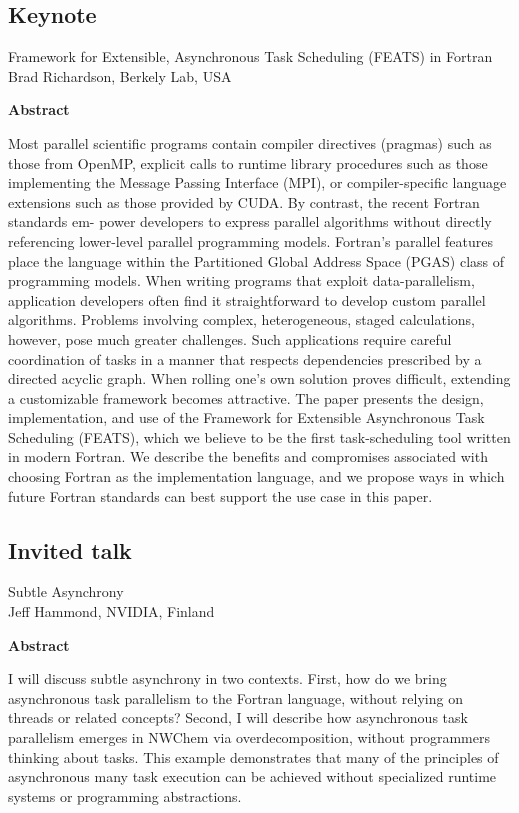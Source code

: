 \documentclass{article}
\begin{document}
\subsection{Keynote}
Framework for Extensible, Asynchronous Task Scheduling (FEATS) in Fortran\\
Brad Richardson, Berkely Lab, USA
    \begin{center}
        \textbf{Abstract}
    \end{center}
Most parallel scientific programs contain compiler directives (pragmas) such as those from OpenMP, explicit calls to runtime library procedures such as those implementing the Message Passing Interface (MPI), or compiler-specific language extensions such as those provided by CUDA. By contrast, the recent Fortran standards em- power developers to express parallel algorithms without directly referencing lower-level parallel programming models. Fortran’s parallel features place the language within the Partitioned Global Address Space (PGAS) class of programming models. When writing programs that exploit data-parallelism, application developers often find it straightforward to develop custom parallel algorithms. Problems involving complex, heterogeneous, staged calculations, however, pose much greater challenges. Such applications require careful coordination of tasks in a manner that respects dependencies prescribed by a directed acyclic graph. When rolling one’s own solution proves difficult, extending a customizable framework becomes attractive. The paper presents the design, implementation, and use of the Framework for Extensible Asynchronous Task Scheduling (FEATS), which we believe to be the first task-scheduling tool written in modern Fortran. We describe the benefits and compromises associated with choosing Fortran as the implementation language, and we propose ways in which future Fortran standards can best support the use case in this paper.

\subsection{Invited talk}
 Subtle Asynchrony\\  
Jeff Hammond, NVIDIA, Finland
    \begin{center}
        \textbf{Abstract}
    \end{center}
I will discuss subtle asynchrony in two contexts. First, how do we bring asynchronous task parallelism to the Fortran language, without relying on threads or related concepts? Second, I will describe how asynchronous task parallelism emerges in NWChem via overdecomposition, without programmers thinking about tasks. This example demonstrates that many of the principles of asynchronous many task execution can be achieved without specialized runtime systems or programming abstractions.
\end{document}
